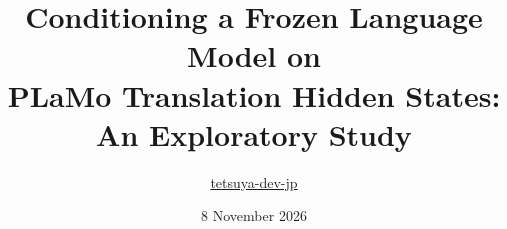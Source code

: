 \documentclass[10pt,a4paper]{article}
\title{Conditioning a Frozen Language Model on\\PLaMo Translation Hidden States:\\An Exploratory Study}
\author{\href{https://github.com/tetsuya-dev-jp}{tetsuya-dev-jp}}
\date{8 November 2026}
\begin{document}
\maketitle
\begin{abstract}

\end{abstract}







\clearpage


\end{document}
